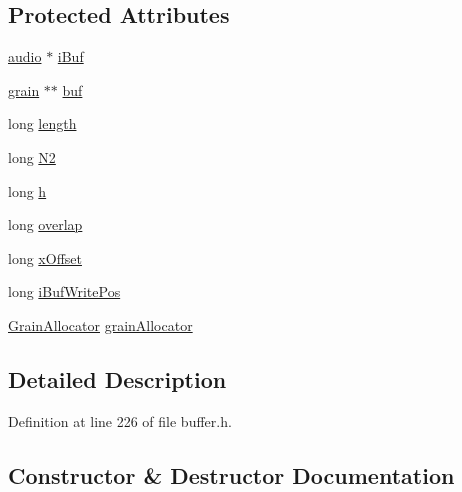 \subsection*{Protected Attributes}
\begin{DoxyCompactItemize}
\item 
\hyperlink{namespace__sbsms___a11786cc5bd221ff534972ae350477324}{audio} $\ast$ \hyperlink{class__sbsms___1_1_grain_buf_ad30a47a1ac64d553c4603760c77f4d80}{i\+Buf}
\item 
\hyperlink{class__sbsms___1_1grain}{grain} $\ast$$\ast$ \hyperlink{class__sbsms___1_1_grain_buf_ab40450f7519ee3e0fe4f726d51b93bc7}{buf}
\item 
long \hyperlink{class__sbsms___1_1_grain_buf_ace83a61e0785931a01bdad90b1b4ac90}{length}
\item 
long \hyperlink{class__sbsms___1_1_grain_buf_a04a57b428df8e80f9dd2b0bf33d3843f}{N2}
\item 
long \hyperlink{class__sbsms___1_1_grain_buf_ad39a40f0146c178ef21a0ce5028d0641}{h}
\item 
long \hyperlink{class__sbsms___1_1_grain_buf_a2ad65e9e81b5292fa88d352f1ec54b32}{overlap}
\item 
long \hyperlink{class__sbsms___1_1_grain_buf_a7b53b779576910bcdbc1a1b2190bff0b}{x\+Offset}
\item 
long \hyperlink{class__sbsms___1_1_grain_buf_a5fa53fb3949b04c098c237b76bd94e6f}{i\+Buf\+Write\+Pos}
\item 
\hyperlink{class__sbsms___1_1_grain_allocator}{Grain\+Allocator} \hyperlink{class__sbsms___1_1_grain_buf_aef014423146ce4eb1b3d55d767fc16aa}{grain\+Allocator}
\end{DoxyCompactItemize}


\subsection{Detailed Description}


Definition at line 226 of file buffer.\+h.



\subsection{Constructor \& Destructor Documentation}
